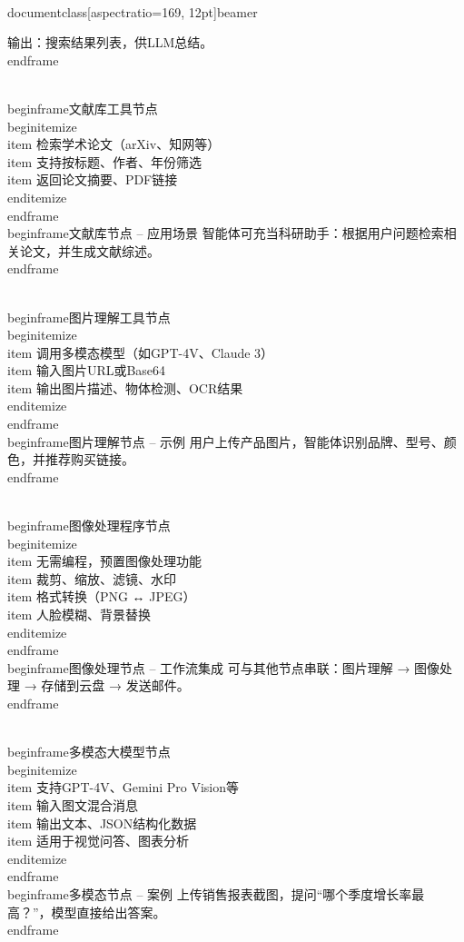 \\documentclass[aspectratio=169, 12pt]{beamer}
\begin{document}
输出：搜索结果列表，供LLM总结。
\\end{frame}

\\begin{frame}{文献库工具节点}
\\begin{itemize}
\\item 检索学术论文（arXiv、知网等）
\\item 支持按标题、作者、年份筛选
\\item 返回论文摘要、PDF链接
\\end{itemize}
\\end{frame}
\\begin{frame}{文献库节点 – 应用场景}
智能体可充当科研助手：根据用户问题检索相关论文，并生成文献综述。
\\end{frame}

\\begin{frame}{图片理解工具节点}
\\begin{itemize}
\\item 调用多模态模型（如GPT-4V、Claude 3）
\\item 输入图片URL或Base64
\\item 输出图片描述、物体检测、OCR结果
\\end{itemize}
\\end{frame}
\\begin{frame}{图片理解节点 – 示例}
用户上传产品图片，智能体识别品牌、型号、颜色，并推荐购买链接。
\\end{frame}

\\begin{frame}{图像处理程序节点}
\\begin{itemize}
\\item 无需编程，预置图像处理功能
\\item 裁剪、缩放、滤镜、水印
\\item 格式转换（PNG ↔ JPEG）
\\item 人脸模糊、背景替换
\\end{itemize}
\\end{frame}
\\begin{frame}{图像处理节点 – 工作流集成}
可与其他节点串联：图片理解 → 图像处理 → 存储到云盘 → 发送邮件。
\\end{frame}

\\begin{frame}{多模态大模型节点}
\\begin{itemize}
\\item 支持GPT-4V、Gemini Pro Vision等
\\item 输入图文混合消息
\\item 输出文本、JSON结构化数据
\\item 适用于视觉问答、图表分析
\\end{itemize}
\\end{frame}
\\begin{frame}{多模态节点 – 案例}
上传销售报表截图，提问“哪个季度增长率最高？”，模型直接给出答案。
\\end{frame}
\end{document}
